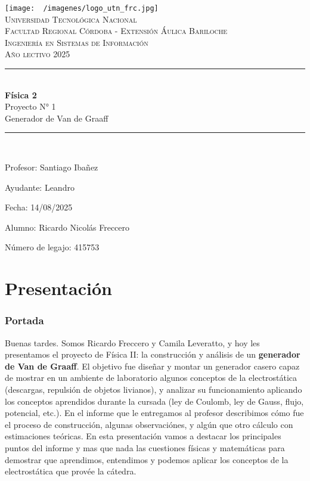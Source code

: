 \documentclass[12pt]{article}
\begin{document}
\begin{titlepage}
  \centering
  \texttt{[image: ~/imagenes/logo\_utn\_frc.jpg]}\\

  \textsc{
    \LARGE Universidad Tecnológica Nacional\\
    \Large Facultad Regional Córdoba - Extensión Áulica Bariloche\\
    \large Ingeniería en Sistemas de Información\\
    Año lectivo 2025\\[0.5cm]
  }

  \rule{\linewidth}{1.0mm}\\[0.4cm]
  \Huge
  \textbf{Física 2}\\
  Proyecto N° 1\\[0.2cm]
  \LARGE
  Generador de Van de Graaff
  \rule{\linewidth}{1.0mm}\\
  \large
  \begin{flushleft}
    Profesor: Santiago Ibañez

    Ayudante: Leandro

    Fecha: 14/08/2025
  \end{flushleft}

  \vfill
  \begin{flushright}
    Alumno: Ricardo Nicolás Freccero

    Número de legajo: 415753
  \end{flushright}
\end{titlepage}

\restoregeometry
\tableofcontents
\newpage

\section{Presentación}
\subsubsection*{Portada}
Buenas tardes. Somos Ricardo Freccero y Camila Leveratto, y hoy les presentamos el proyecto de Física II: la construcción y análisis de un \textbf{generador de Van de Graaff}. El objetivo fue diseñar y montar un generador casero capaz de mostrar en un ambiente de laboratorio algunos conceptos de la electrostática (descargas, repulsión de objetos livianos), y analizar su funcionamiento aplicando los conceptos aprendidos durante la cursada (ley de Coulomb, ley de Gauss, flujo, potencial, etc.). En el informe que le entregamos al profesor describimos cómo fue el proceso de construcción, algunas observaciónes, y algún que otro cálculo con estimaciones teóricas. En esta presentación vamos a destacar los principales puntos del informe y mas que nada las cuestiones físicas y matemáticas para demostrar que aprendimos, entendimos y podemos aplicar los conceptos de la electrostática que provée la cátedra.
\end{document}
